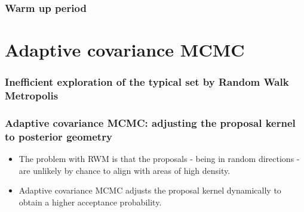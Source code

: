 \documentclass[handout]{beamer}
\begin{document}
\begin{frame}
\frametitle{Warm up period}


\end{frame}

\section{Adaptive covariance MCMC}
\frame{\tableofcontents[currentsection]}

\begin{frame}
	\frametitle{Inefficient exploration of the typical set by Random Walk Metropolis}
	
	\begin{figure}[t]
		\centerline{}
	\end{figure}
	
\end{frame}

\begin{frame}
	\frametitle{Adaptive covariance MCMC: adjusting the proposal kernel to posterior geometry}
	
	\begin{itemize}
		\item The problem with RWM is that the proposals - being in random directions - are unlikely by chance to align with areas of high density.
		\item Adaptive covariance MCMC adjusts the proposal kernel dynamically to obtain a higher acceptance probability.
	\end{itemize}
	
\end{frame}
\end{document}
